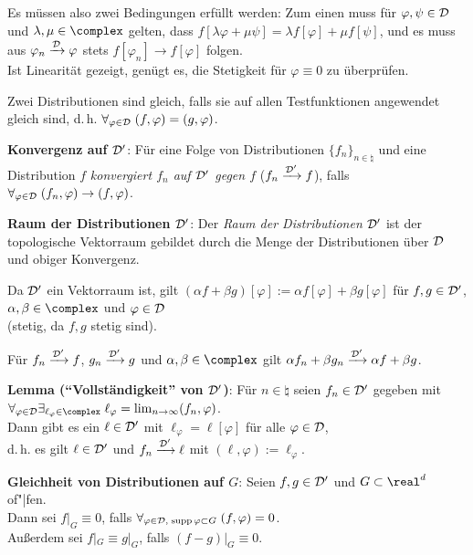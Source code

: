Es müssen also zwei Bedingungen erfüllt werden:
Zum einen muss für $\varphi, \psi \in \mathcal{D}$ und $\lambda, \mu \in \complex$
gelten, dass
$f[\lambda \varphi + \mu \psi] = \lambda f[\varphi] + \mu f[\psi]$,
und es muss aus $\varphi_n \xrightarrow{\mathcal{D}} \varphi$ stets
$f[\varphi_n] \to f[\varphi]$ folgen.\\
Ist Linearität gezeigt, genügt es, die Stetigkeit für $\varphi \equiv 0$
zu überprüfen.

Zwei Distributionen sind gleich, falls sie auf allen Testfunktionen angewendet
gleich sind, d.\,h. $\forall_{\varphi \in \mathcal{D}}\; (f, \varphi) = (g, \varphi)$.

\textbf{Konvergenz auf $\mathcal{D}'$}:
Für eine Folge von Distributionen $\{f_n\}_{n \in \natural}$ und
eine Distribution $f$ \emph{konvergiert $f_n$ auf $\mathcal{D}'$ gegen $f$}
($f_n \xrightarrow{\mathcal{D}'} f$), falls
$\forall_{\varphi \in \mathcal{D}}\; (f_n, \varphi) \to (f, \varphi)$.

\textbf{Raum der Distributionen $\mathcal{D}'$}:
Der \emph{Raum der Distributionen $\mathcal{D}'$} ist der topologische Vektorraum
gebildet durch die Menge der Distributionen über $\mathcal{D}$ und obiger Konvergenz.

Da $\mathcal{D}'$ ein Vektorraum ist, gilt
$(\alpha f + \beta g)[\varphi] := \alpha f[\varphi] + \beta g[\varphi]$
für $f, g \in \mathcal{D}'$, $\alpha, \beta \in \complex$ und $\varphi \in \mathcal{D}$\\
(stetig, da $f, g$ stetig sind).

Für $f_n \xrightarrow{\mathcal{D}'} f$, $g_n \xrightarrow{\mathcal{D}'} g$ und
$\alpha, \beta \in \complex$ gilt
$\alpha f_n + \beta g_n \xrightarrow{\mathcal{D}'} \alpha f + \beta g$.

\linie

\textbf{Lemma ("`Vollständigkeit"' von $\mathcal{D}'$)}:
Für $n \in \natural$ seien $f_n \in \mathcal{D}'$ gegeben mit\\
$\forall_{\varphi \in \D} \exists_{\ell_\varphi \in \complex}\;
\ell_\varphi = \lim_{n \to \infty} (f_n, \varphi)$.\\
Dann gibt es ein $\ell \in \mathcal{D}'$ mit $\ell_\varphi = \ell[\varphi]$ für
alle $\varphi \in \mathcal{D}$,\\
d.\,h. es gilt $\ell \in \mathcal{D}'$ und $f_n \xrightarrow{\mathcal{D}'} \ell$ mit
$(\ell, \varphi) := \ell_\varphi$.

\linie

\textbf{Gleichheit von Distributionen auf $G$}:
Seien $f, g \in \mathcal{D}'$ und $G \subset \real^d$ of"|fen.\\
Dann sei $f|_G \equiv 0$, falls
$\forall_{\varphi \in \mathcal{D},\; \operatorname{supp} \varphi \subset G}\; (f, \varphi) = 0$.\\
Außerdem sei $f|_G \equiv g|_G$, falls $(f - g)|_G \equiv 0$.

